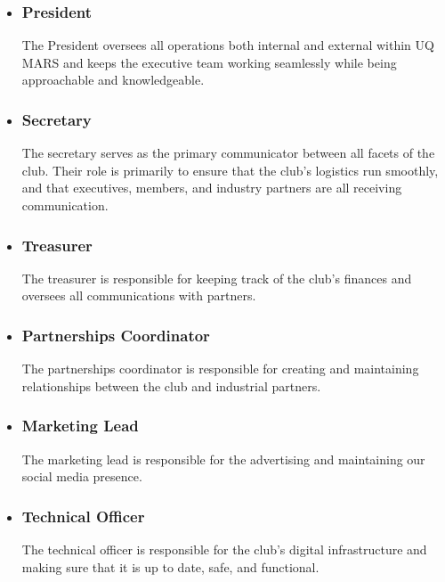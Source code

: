 \documentclass[a4paper,12pt]{report}
\begin{document}
\begin{itemize}
    \item \subsubsection{President}
    The President oversees all operations both internal and external within UQ MARS and keeps the executive team working seamlessly while being approachable and knowledgeable. 

    \item \subsubsection{Secretary}
    The secretary serves as the primary communicator between all facets of the club. Their role is primarily to ensure that the club's logistics run smoothly, and that executives, members, and industry partners are all receiving communication.

    \item \subsubsection{Treasurer}
    The treasurer is responsible for keeping track of the club's finances and oversees all communications with partners.

    \item \subsubsection{Partnerships Coordinator}
    The partnerships coordinator is responsible for creating and maintaining relationships between the club and industrial partners.
    
    \item \subsubsection{Marketing Lead}
    The marketing lead is responsible for the advertising and maintaining our social media presence.
    
    \item \subsubsection{Technical Officer}
    The technical officer is responsible for the club's digital infrastructure and making sure that it is up to date, safe, and functional.
    

\end{itemize}
\end{document}
